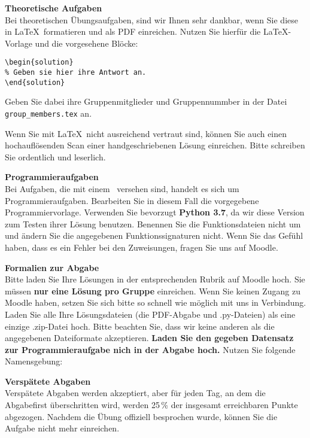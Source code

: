\textbf{Theoretische Aufgaben}\\
Bei theoretischen Übungsaufgaben, sind wir Ihnen sehr dankbar, wenn Sie diese in \LaTeX~formatieren und als PDF einreichen.
Nutzen Sie hierfür die \LaTeX-Vorlage und die vorgesehene Blöcke:
\begin{verbatim}
\begin{solution}
% Geben sie hier ihre Antwort an.
\end{solution}
\end{verbatim}

Geben Sie dabei ihre Gruppenmitglieder und Gruppennummber in der Datei \texttt{group\_members.tex} an.

Wenn Sie mit \LaTeX~nicht ausreichend vertraut sind, können Sie auch einen hochauflösenden Scan einer handgeschriebenen Lösung einreichen.
Bitte schreiben Sie ordentlich und leserlich.

\textbf{Programmieraufgaben}\\
Bei Aufgaben, die mit einem \codesym~versehen sind, handelt es sich um Programmieraufgaben.
Bearbeiten Sie in diesem Fall die vorgegebene Programmiervorlage.
Verwenden Sie bevorzugt \textbf{Python 3.7}, da wir diese Version zum Testen ihrer Lösung benutzen.
Benennen Sie die Funktionsdateien nicht um und ändern Sie die angegebenen Funktionssignaturen nicht. Wenn Sie das Gefühl haben, dass es ein
Fehler bei den Zuweisungen, fragen Sie uns auf Moodle.

\textbf{Formalien zur Abgabe}\\
Bitte laden Sie Ihre Lösungen in der entsprechenden Rubrik auf Moodle hoch. Sie müssen \textbf{nur eine Lösung pro Gruppe} einreichen. Wenn Sie keinen Zugang zu Moodle haben, setzen Sie sich bitte so schnell wie möglich mit uns in Verbindung. Laden Sie alle Ihre Lösungsdateien (die PDF-Abgabe und .py-Dateien) als eine einzige .zip-Datei hoch. Bitte beachten Sie, dass wir keine anderen als die angegebenen Dateiformate akzeptieren.
\textbf{Laden Sie den gegeben Datensatz zur Programmieraufgabe nich in der Abgabe hoch.
}
Nutzen Sie folgende Namensgebung:

\vspace{0.2cm}

\textbf{Verspätete Abgaben}\\
Verspätete Abgaben werden akzeptiert, aber für jeden Tag, an dem die Abgabefirst überschritten wird, werden 25\,\% der insgesamt erreichbaren Punkte abgezogen. Nachdem die Übung offiziell besprochen wurde, können Sie die Aufgabe nicht mehr einreichen.

